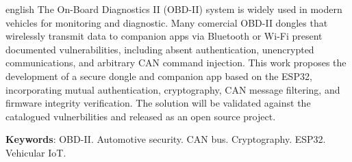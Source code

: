 \documentclass[
	12pt,				%
	openright,			%
	oneside,			%
	a4paper,			%
	english,			%
	french,				%
	spanish,			%
	brazil				%
	]{abntex2}
\newcommand{\listofquadrosname}{Lista de quadros}
\begin{document}
\begin{resumo}[Abstract]
 \begin{otherlanguage*}{english}
   The On-Board Diagnostics II (OBD-II) system is widely used in modern vehicles for monitoring and diagnostic. Many comercial OBD-II dongles that wirelessly transmit data to companion apps via Bluetooth or Wi-Fi present documented vulnerabilities, including absent authentication, unencrypted communications, and arbitrary CAN command injection. This work proposes the development of a secure dongle and companion app based on the ESP32, incorporating mutual authentication, cryptography, CAN message filtering, and firmware integrity verification. The solution will be validated against the catalogued vulnerbilities and released as an open source project.

   \vspace{\onelineskip}
 
   \noindent 
   \textbf{Keywords}: OBD-II. Automotive security. CAN bus. 
   Cryptography. ESP32. Vehicular IoT.
 \end{otherlanguage*}
\end{resumo}

 

  

\listoffigures*
\cleardoublepage


\listoftables*
\cleardoublepage
\end{document}
